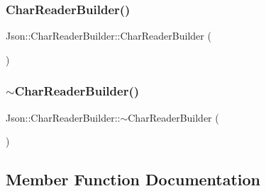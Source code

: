 \hypertarget{class_json_1_1_char_reader_builder_a6e197b69a2ede3d87b03b9c5c78ba46a}{}\label{class_json_1_1_char_reader_builder_a6e197b69a2ede3d87b03b9c5c78ba46a} 
\subsubsection{\texorpdfstring{Char\+Reader\+Builder()}{CharReaderBuilder()}\hspace{0.1cm}{\footnotesize\ttfamily [2/2]}}
{\footnotesize\ttfamily Json\+::\+Char\+Reader\+Builder\+::\+Char\+Reader\+Builder (\begin{DoxyParamCaption}{ }\end{DoxyParamCaption})}

\hypertarget{class_json_1_1_char_reader_builder_ae8226503f5b947e9d618c39dd992c85c}{}\label{class_json_1_1_char_reader_builder_ae8226503f5b947e9d618c39dd992c85c} 
\subsubsection{\texorpdfstring{$\sim$\+Char\+Reader\+Builder()}{~CharReaderBuilder()}\hspace{0.1cm}{\footnotesize\ttfamily [2/2]}}
{\footnotesize\ttfamily Json\+::\+Char\+Reader\+Builder\+::$\sim$\+Char\+Reader\+Builder (\begin{DoxyParamCaption}{ }\end{DoxyParamCaption})}



\subsection{Member Function Documentation}
\hypertarget{class_json_1_1_char_reader_builder_ab14c54e438007a57c1acbd6e7459d4d0}{}\label{class_json_1_1_char_reader_builder_ab14c54e438007a57c1acbd6e7459d4d0} 
